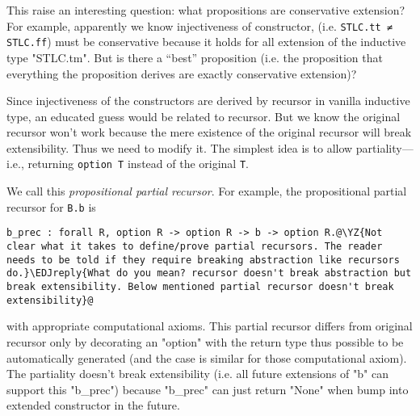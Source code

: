 This raise an interesting question: what propositions are conservative extension? For example, apparently we know injectiveness of constructor, (i.e. \texttt{STLC.tt ≠ STLC.ff}) must be conservative because it holds for all extension of the inductive type "STLC.tm". But is there a ``best'' proposition (i.e. the proposition that everything the proposition derives are exactly conservative extension)?

Since injectiveness of the constructors are derived by recursor in vanilla inductive type, an educated guess would be related to recursor. But we know the original recursor won't work because the mere existence of the original recursor will break extensibility. Thus we need to modify it.
The simplest idea is to allow partiality---i.e., returning
\texttt{option T} instead of the original \texttt{T}.

We call this \textit{propositional partial recursor}.
For example, the propositional partial recursor for \texttt{B.b} is

\begin{verbatim}
b_prec : forall R, option R -> option R -> b -> option R.@\YZ{Not clear what it takes to define/prove partial recursors. The reader needs to be told if they require breaking abstraction like recursors do.}\EDJreply{What do you mean? recursor doesn't break abstraction but break extensibility. Below mentioned partial recursor doesn't break extensibility}@
\end{verbatim}
with appropriate computational axioms. This partial recursor differs from original recursor only by decorating an "option" with the return type thus possible to be automatically generated (and the case is similar for those computational axiom). The partiality doesn't break
extensibility (i.e. all future extensions of "b" can support this
"b_prec") because "b_prec" can just return "None" when bump into extended constructor in the future. 


